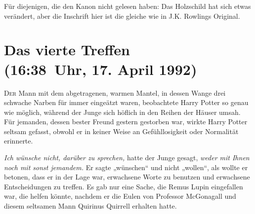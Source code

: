 
\begin{chapterOpeningAuthorNote}
Für diejenigen, die den Kanon nicht gelesen haben: Das Holzschild hat sich etwas verändert, aber die Inschrift hier ist die gleiche wie in J.K. Rowlings Original.
\end{chapterOpeningAuthorNote}

\section{Das vierte Treffen\\
(16:38~Uhr, 17. April 1992)}

\lettrine{D}{er} Mann mit dem abgetragenen, warmen Mantel, in dessen Wange drei schwache Narben für immer eingeätzt waren, beobachtete Harry Potter so genau wie möglich, während der Junge sich höflich in den Reihen der Häuser umsah. Für jemanden, dessen bester Freund gestern gestorben war, wirkte Harry Potter seltsam gefasst, obwohl er in keiner Weise an Gefühllosigkeit oder Normalität erinnerte.

\emph{Ich wünsche nicht, darüber zu sprechen,} hatte der Junge gesagt, \emph{weder mit Ihnen noch mit sonst jemandem.} Er sagte „wünschen“ und nicht „wollen“, als wollte er betonen, dass er in der Lage war, erwachsene Worte zu benutzen und erwachsene Entscheidungen zu treffen. Es gab nur eine Sache, die Remus Lupin eingefallen war, die helfen könnte, nachdem er die Eulen von Professor McGonagall und diesem seltsamen Mann Quirinus Quirrell erhalten hatte.

